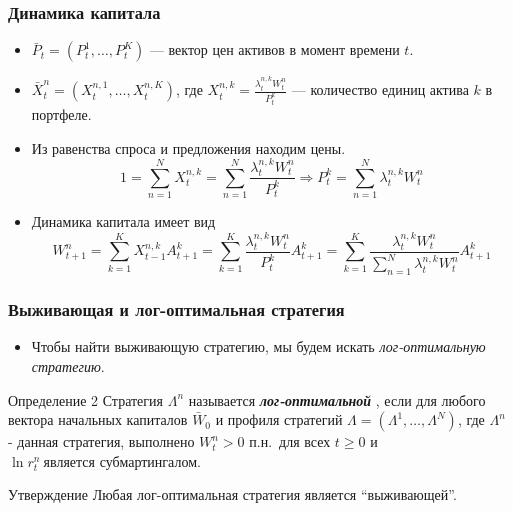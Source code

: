 \documentclass[10pt]{beamer}
\theoremstyle{definition}
\theoremstyle{remark}
\begin{document}
\begin{frame}\frametitle{Динамика капитала}
    \begin{itemize}
    \item $\bar P_t = (P_{t}^1,\ldots,P_{t}^K)$ — вектор цен активов в момент времени $t$.\\

    \item $\bar X_t^n=(X_{t}^{n,1},\dots,X_{t}^{n,K})$, где $X_{t}^{n,k}= \frac{\lambda_{t}^{n,k} W_t^n}{P_{t}^k}$ — количество единиц актива $k$ в портфеле.\\

	\item  Из равенства спроса и предложения находим цены.\\
     \[
    1 = \sum_{n=1}^{N}X_{t}^{n,k} 
    = \sum_{n=1}^{N}\frac{\lambda_{t}^{n,k}W_{t}^{n}}{P_{t}^k}
    \Rightarrow  \boxed {P_{t}^k = \sum_{n=1}^{N}\lambda_{t}^{n,k}W_{t}^{n}}
    \]
    
    \item Динамика капитала имеет вид
    $$
    W_{t+1}^n = \sum_{k=1}^K 
    X_{t-1}^{n,k} A_{t+1}^k =
    \sum_{k=1}^K \frac{\lambda_{t}^{n,k} W_t^n}{P_t^k} A_{t+1}^k=
    \boxed {\sum_{k=1}^K \frac{\lambda_{t}^{n,k} W_t^n}{\sum_{n=1}^N \lambda_{t}^{n,k} W_t^n} A_{t+1}^k}
    $$
    \end{itemize}
 
\end{frame}



\begin{frame}\frametitle{Выживающая и лог-оптимальная стратегия}
    \begin{itemize}
    \item Чтобы найти выживающую стратегию, мы будем искать \emph{лог-оптимальную стратегию}.
    \end{itemize}
    
    \begin{block}{Определение 2}
    Стратегия $\Lambda^n$ называется \emph{\bf лог-оптимальной }, если  для любого вектора начальных капиталов $\bar W_0$ и профиля стратегий $\Lambda=(\Lambda^1,\ldots,\Lambda^N)$, где $\Lambda^n$ - данная стратегия, выполнено $W_t^n > 0$ п.н.\ для всех $t\ge 0$ и $\ln r_t^n\ \text{является субмартингалом}.$
    \end{block}

    \begin{block}{Утверждение}
    Любая лог-оптимальная стратегия является “выживающей”.
    \end{block}
\end{frame}
\end{document}
